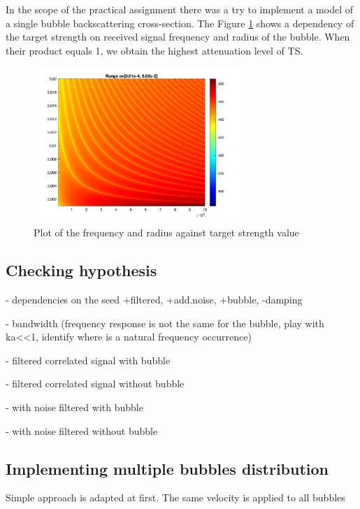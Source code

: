 \documentclass[11pt]{article}
\begin{document}
In the scope of the practical assignment there was a try to implement a model of a single bubble backscattering cross-section. The Figure \ref{fig:imagesc_Freq-Radius-TS-1} shows a dependency of the target strength on received signal frequency and radius of the bubble. When their product equals 1, we obtain the highest attenuation level of TS.
\begin{figure} [H]
    \centering
    \includegraphics[width=0.7\textwidth]{figures/imagesc_Freq-Radius-TS-1.png}
    \caption{Plot of the frequency and radius against target strength value}
    \label{fig:imagesc_Freq-Radius-TS-1}
\end{figure}

\subsection{Checking hypothesis}
- dependencies on the seed
+filtered, +add.noise, +bubble, -damping

- bandwidth (frequency response is not the same for the bubble, play with ka<<1, identify where is a natural frequency occurrence)

- filtered correlated signal with bubble

- filtered correlated signal without bubble

- with noise filtered with bubble

- with noise filtered without bubble

\subsection{Implementing multiple bubbles distribution}

Simple approach is adapted at first. The same velocity is applied to all bubbles
\end{document}
